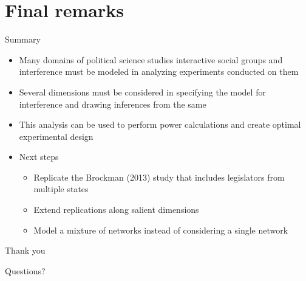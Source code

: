 \documentclass{beamer}
\begin{document}
\section{Final remarks}

\begin{frame}{Summary}
  \begin{itemize}
  \item
    Many domains of political science studies interactive social groups and interference must be modeled in analyzing experiments conducted on them
  \item
    Several dimensions must be considered in specifying the model for interference and drawing inferences from the same
  \item
    This analysis can be used to perform power calculations and create optimal experimental design
  \end{itemize}
  
  \begin{itemize}
  \item
    Next steps
    \begin{itemize}
    \item Replicate the Brockman (2013) study that includes legislators from multiple states
    \item Extend replications along salient dimensions
    \item Model a mixture of networks instead of considering a single network
    \end{itemize}
  \end{itemize}
\end{frame}


\begin{frame}
\Huge{\centerline{Thank you}}
\Huge{\centerline{Questions?}}
\end{frame}
\end{document}
